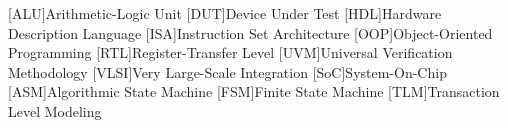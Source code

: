 



\begin{acronym}
    [ALU]{Arithmetic-Logic Unit}
    [DUT]{Device Under Test}
    [HDL]{Hardware Description Language}
    [ISA]{Instruction Set Architecture}
    [OOP]{Object-Oriented Programming}
    [RTL]{Register-Transfer Level}
    [UVM]{Universal Verification Methodology}
    [VLSI]{Very Large-Scale Integration}
    [SoC]{System-On-Chip}
    [ASM]{Algorithmic State Machine}
    [FSM]{Finite State Machine}
    [TLM]{Transaction Level Modeling}
\end{acronym}